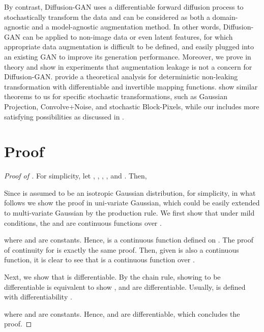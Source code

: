 \documentclass{article} \usepackage{iclr2023_conference,times}
\theoremstyle{plain}
\theoremstyle{definition}
\theoremstyle{remark}
\begin{document}
By contrast,
Diffusion-GAN  
uses a differentiable  forward diffusion process to stochastically transform the data and can be considered as both a domain-agnostic and a model-agnostic augmentation method. In other words, Diffusion-GAN can be applied to non-image data or even latent features, for which appropriate data augmentation is difficult to be defined, and easily plugged into an existing GAN to improve its generation performance. Moreover, 
we prove in theory and show in experiments that 
augmentation leakage is not a concern for
Diffusion-GAN.  
\citet{Tran2021OnDA} provide a theoretical analysis for deterministic non-leaking transformation with differentiable and invertible mapping functions. 
\citet{Bora2018AmbientGANGM} show similar theorems to us for specific stochastic transformations, such as Gaussian Projection, Convolve+Noise, and stochastic Block-Pixels, while our  includes more satisfying possibilities as discussed in  . 



\section{Proof} \label{sec:appendix_proof}

\begin{proof}[Proof of ]
For simplicity, let , , , ,  and . Then, 




Since  is assumed to be an isotropic Gaussian distribution, for simplicity, in what follows we show the proof in uni-variate Gaussian, which could be easily extended to multi-variate Gaussian by the production rule. We first show that under mild conditions, the  and  are continuous functions over . 

where  and  are constants. Hence,  is a continuous function defined on . The proof of continuity for  is exactly the same proof. Then, given  is also a continuous function, it is clear to see that  is a continuous function over . 

Next, we show that  is differentiable. By the chain rule, showing  to be differentiable is equivalent to show ,  and  are differentiable. Usually,  is defined with differentiability \citep{nowozin2016f-gan}. 


where  and  are constants. Hence,  and  are differentiable, which concludes the proof. 
\end{proof}
\end{document}
